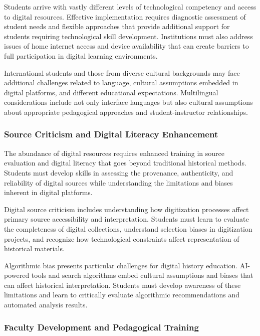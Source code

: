 Students arrive with vastly different levels of technological competency and access to digital resources. Effective implementation requires diagnostic assessment of student needs and flexible approaches that provide additional support for students requiring technological skill development. Institutions must also address issues of home internet access and device availability that can create barriers to full participation in digital learning environments.

International students and those from diverse cultural backgrounds may face additional challenges related to language, cultural assumptions embedded in digital platforms, and different educational expectations. Multilingual considerations include not only interface languages but also cultural assumptions about appropriate pedagogical approaches and student-instructor relationships.

\subsubsection  {Source Criticism and Digital Literacy Enhancement}

The abundance of digital resources requires enhanced training in source evaluation and digital literacy that goes beyond traditional historical methods. Students must develop skills in assessing the provenance, authenticity, and reliability of digital sources while understanding the limitations and biases inherent in digital platforms.

Digital source criticism includes understanding how digitization processes affect primary source accessibility and interpretation. Students must learn to evaluate the completeness of digital collections, understand selection biases in digitization projects, and recognize how technological constraints affect representation of historical materials.

Algorithmic bias presents particular challenges for digital history education. AI-powered tools and search algorithms embed cultural assumptions and biases that can affect historical interpretation. Students must develop awareness of these limitations and learn to critically evaluate algorithmic recommendations and automated analysis results.

\subsubsection {Faculty Development and Pedagogical Training}


